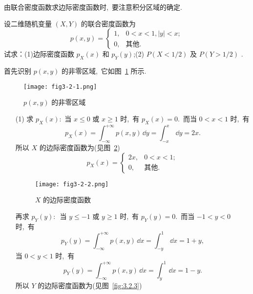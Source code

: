   由联合密度函数求边际密度函数时,\ 要注意积分区域的确定.
  \begin{example}\label{exam:3.2.3}
  	设二维随机变量 $(X,Y)$ 的联合密度函数为
  	\begin{equation*}
  	p(x,y)=
  	\begin{cases}
  	1, & 0<x<1,|y|<x;\\
  	0, & \text{其他}.
  	\end{cases}
  	\end{equation*}
  	试求：(1)边际密度函数 $p_{X}(x)$ 和 $p_{Y}(y)$;(2) $P(X<1/2)$ 及 $P(Y>1/2)$ .
  \end{example}
  \begin{solution}
  	首先识别 $p(x,y)$ 的非零区域,\ 它如图~\ref{fig:3.2.1} 所示.
  	\begin{figure}[htbp]
  		\centering
  		\texttt{[image: fig3-2-1.png]}
  		\caption{$p(x,y)$ 的非零区域}\label{fig:3.2.1}
  	\end{figure}
  	\begin{itemize}
  		\item[(1)]求 $p_X(x)$:\ 当 $x\leqslant0$ 或 $x\geqslant1$ 时,\ 有 $p_X(x)=0$.\ 而当 $0<x<1$ 时,\ 有
  		\begin{equation*}
  		p_X(x)=\int_{-\infty}^{+\infty}p(x,y)\,\dd y=\int_{-x}^{x}\,\dd y=2x.
  		\end{equation*}
  		所以 $X$ 的边际密度函数为(见图~\ref{fig:3.2.2})
  		\begin{equation*}
  		p_X(x)=
  		\begin{cases}
  		2x, & 0<x<1;\\
  		0, & \text{其他}.
  		\end{cases}
  		\end{equation*}
  		\begin{figure}[h]
  			\centering
  			\texttt{[image: fig3-2-2.png]}
  			\caption{$X$ 的边际密度函数}\label{fig:3.2.2}
  		\end{figure}
  		再求 $p_Y(y):$\ 当 $y\leqslant-1$ 或 $y\geqslant1$ 时,\ 有 $p_Y(y)=0$.\ 而当 $-1<y<0$ 时,\ 有
  		\begin{equation*}
  		p_Y(y)=\int_{-\infty}^{+\infty}p(x,y)\,\dd x=\int_{-y}^{1}\,\dd x=1+y,
  		\end{equation*}
  		当 $0<y<1$ 时,\ 有
  		\begin{equation*}
  		p_Y(y)=\int_{-\infty}^{+\infty}p(x,y)\,\dd x=\int_{y}^{1}\,\dd x=1-y.
  		\end{equation*}
  		所以 $Y$ 的边际密度函数为(见图~\ref{fig:3.2.3})
  		\begin{equation*}

\end{equation*}
\end{itemize}
\end{solution}
